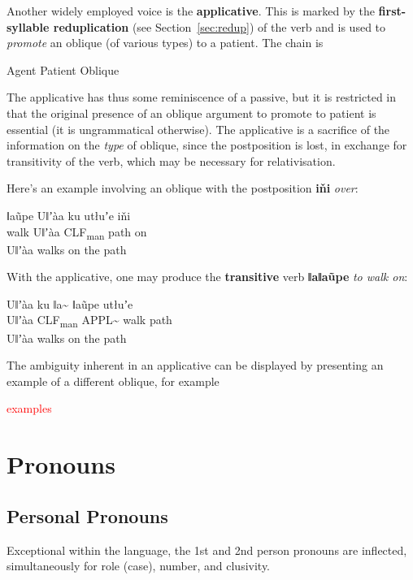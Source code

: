 \documentclass[11pt]{book}
\newcommand{\qcn}[1]{\textbf{#1}}
\newcommand{\transl}[2]{\qcn{#1} \emph{#2}}
\newcommand{\grammsc}[1]{\textsc{#1}}
\newcommand{\CLF}[1]{\grammsc{CLF}\textsubscript{#1}}
\newcommand{\cmnt}[1]{\textcolor{red}{#1}}
\begin{document}
Another widely employed voice is the \textbf{applicative}. This is marked by the \textbf{first-syllable reduplication} (see Section~\ref{sec:redup}) of the verb and is used to \emph{promote} an oblique (of various types) to a patient. The chain is

\begin{center}
	Agent \textleftarrow Patient \textleftarrow Oblique
\end{center}

The applicative has thus some reminiscence of a passive, but it is restricted in that the original presence of an oblique argument to promote to patient is essential (it is ungrammatical otherwise). The applicative is a sacrifice of the information on the \emph{type} of oblique, since the postposition is lost, in exchange for transitivity of the verb, which may be necessary for relativisation.

Here's an example involving an oblique with the postposition \transl{iňi}{over}:

\begin{exe}
\ex
\gll ǁaũpe Uǁʼàa ku utłuʼe iňi\\
walk Uǁʼàa \CLF{man} path on\\
\glt Uǁʼàa walks on the path
\end{exe}

With the applicative, one may produce the \textbf{transitive} verb \transl{ǁaǁaũpe}{to walk on}:

\begin{exe}
\ex
\gll Uǁʼàa ku ǁa\textasciitilde{} ǁaũpe utłuʼe \\
Uǁʼàa \CLF{man} APPL\textasciitilde{} walk path \\
\glt Uǁʼàa walks on the path
\end{exe}

The ambiguity inherent in an applicative can be displayed by presenting an example of a different oblique, for example

\cmnt{examples}

\section{Pronouns}


\subsection{Personal Pronouns}

Exceptional within the language, the 1st and 2nd person pronouns are inflected, simultaneously for role (case), number, and clusivity.
\end{document}
